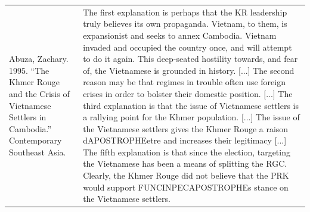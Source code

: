 {\begin{longtable}{p{}p{}}
Abuza, Zachary. 1995. “The Khmer Rouge and the Crisis of Vietnamese Settlers in Cambodia.” Contemporary Southeast Asia. & The first explanation is perhaps that the KR leadership truly believes its own propaganda. Vietnam, to them, is expansionist and seeks to annex Cambodia. Vietnam invaded and occupied the country once, and will attempt to do it again. This deep-seated hostility towards, and fear of, the Vietnamese is grounded in history. [...] The second reason may be that regimes in trouble often use foreign crises in order to bolster their domestic position. [...] The third explanation is that the issue of Vietnamese settlers is a rallying point for the Khmer population. [...] The issue of the Vietnamese settlers gives the Khmer Rouge a raison dAPOSTROPHEetre and increases their legitimacy [...] The fifth explanation is that since the election, targeting the Vietnamese has been a means of splitting the RGC. Clearly, the Khmer Rouge did not believe that the PRK would support FUNCINPECAPOSTROPHEs stance on the Vietnamese settlers.
\\

\end{longtable}}
